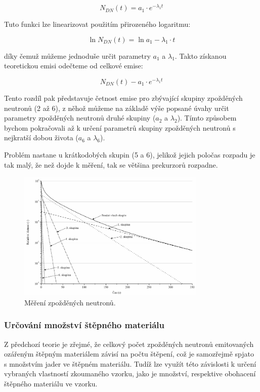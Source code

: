 \[
N_{DN}(t) = a_1 \cdot e^{-\lambda_1 t}
\]

Tuto funkci lze linearizovat použitím přirozeného logaritmu:

\[
\ln N_{DN}(t) = \ln a_1 - \lambda_1 \cdot t
\]

díky čemuž můžeme jednoduše určit parametry $a_1$ a $\lambda_1$. Takto získanou teoretickou emisi odečteme od celkové emise:

\[
N_{DN}(t) - a_1 \cdot e^{-\lambda_1 t}
\]

Tento rozdíl pak představuje četnost emise pro zbývající skupiny zpožděných neutronů (2 až 6), z něhož můžeme na základě výše popsané úvahy určit parametry zpožděných neutronů druhé skupiny ($a_2$ a $\lambda_2$). Tímto způsobem bychom pokračovali až k určení parametrů skupiny zpožděných neutronů s nejkratší dobou života ($a_6$ a $\lambda_6$).

Problém nastane u krátkodobých skupin (5 a 6), jelikož jejich poločas rozpadu je tak malý, že než dojde k měření, tak se většina prekurzorů rozpadne.

\begin{figure}[H] 
    \centering
    \includegraphics[width=0.8\textwidth]{img/ZpožděnéNautrony2.png}
    \caption{Měření zpožděných neutronů.}
    \label{fig:MěřeníZpožděnek}
\end{figure}

\subsubsection{Určování množství štěpného materiálu}

Z předchozí teorie je zřejmé, že celkový počet zpožděných neutronů emitovaných ozářeným štěpným materiálem závisí na počtu štěpení, což je samozřejmě spjato s množstvím jader ve štěpném materiálu. Tudíž lze využít této závislosti k určení vybraných vlastností zkoumaného vzorku, jako je množství, respektive obohacení štěpného materiálu ve vzorku.

